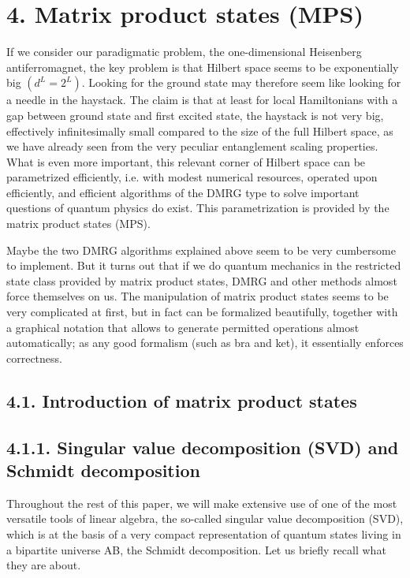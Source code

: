 \documentclass[12pt]{article}
\begin{document}
\section*{4. Matrix product states (MPS)}
If we consider our paradigmatic problem, the one-dimensional Heisenberg antiferromagnet, the key problem is that Hilbert space seems to be exponentially big $\left(d^{L}=2^{L}\right)$. Looking for the ground state may therefore seem like looking for a needle in the haystack. The claim is that at least for local Hamiltonians with a gap between ground state and first excited state, the haystack is not very big, effectively infinitesimally small compared to the size of the full Hilbert space, as we have already seen from the very peculiar entanglement scaling properties. What is even more important, this relevant corner of Hilbert space can be parametrized efficiently, i.e. with modest numerical resources, operated upon efficiently, and efficient algorithms of the DMRG type to solve important questions of quantum physics do exist. This parametrization is provided by the matrix product states (MPS).

Maybe the two DMRG algorithms explained above seem to be very cumbersome to implement. But it turns out that if we do quantum mechanics in the restricted state class provided by matrix product states, DMRG and other methods almost force themselves on us. The manipulation of matrix product states seems to be very complicated at first, but in fact can be formalized beautifully, together with a graphical notation that allows to generate permitted operations almost automatically; as any good formalism (such as bra and ket), it essentially enforces correctness.

\subsection*{4.1. Introduction of matrix product states}
\subsection*{4.1.1. Singular value decomposition (SVD) and Schmidt decomposition}
Throughout the rest of this paper, we will make extensive use of one of the most versatile tools of linear algebra, the so-called singular value decomposition (SVD), which is at the basis of a very compact representation of quantum states living in a bipartite universe AB, the Schmidt decomposition. Let us briefly recall what they are about.
\end{document}
